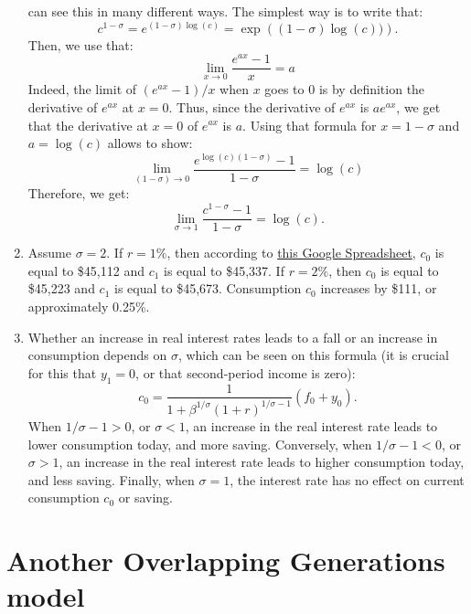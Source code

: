 \documentclass[]{book}
\begin{document}
\begin{enumerate}
  can see this in many different ways. The simplest way is to write
  that:
  \[c^{1-\sigma}=e^{(1-\sigma)\log(c)}=\exp\left((1-\sigma)\log(c))\right).\]
  Then, we use that: \[\lim_{x \to 0} \frac{e^{ax}-1}{x}=a\] Indeed, the
  limit of \((e^{ax}-1)/x\) when \(x\) goes to \(0\) is by definition
  the derivative of \(e^{ax}\) at \(x=0\). Thus, since the derivative of
  \(e^{ax}\) is \(ae^{ax}\), we get that the derivative at \(x=0\) of
  \(e^{ax}\) is \(a\). Using that formula for \(x = 1-\sigma\) and
  \(a=\log(c)\) allows to show:
  \[\lim_{(1-\sigma) \to 0} \frac{e^{\log(c)(1-\sigma)}-1}{1-\sigma}=\log(c)\]
  Therefore, we get:
  \[\lim_{\sigma \to 1} \frac{c^{1-\sigma}-1}{1-\sigma}=\log(c).\]
\item
  Assume \(\sigma = 2\). If \(r = 1\%\), then according to
  \href{https://docs.google.com/spreadsheets/d/1dDFa5YZE5170Tv36klHQ19ykK2bP9wjeR0Y1_h-kacg/edit?usp=sharing}{this
  Google Spreadsheet}, \(c_0\) is equal to \$45,112 and \(c_1\) is equal
  to \$45,337. If \(r = 2\%\), then \(c_0\) is equal to \$45,223 and
  \(c_1\) is equal to \$45,673. Consumption \(c_0\) increases by \$111,
  or approximately 0.25\%.
\item
  Whether an increase in real interest rates leads to a fall or an
  increase in consumption depends on \(\sigma\), which can be seen on
  this formula (it is crucial for this that \(y_1=0\), or that
  second-period income is zero):
  \[c_0 = \frac{1}{1 +\beta^{1/\sigma}(1+r)^{1/\sigma-1}} \left( f_0 + y_0\right).\]
  When \(1/\sigma-1>0\), or \(\sigma<1\), an increase in the real
  interest rate leads to lower consumption today, and more saving.
  Conversely, when \(1/\sigma-1<0\), or \(\sigma>1\), an increase in the
  real interest rate leads to higher consumption today, and less saving.
  Finally, when \(\sigma=1\), the interest rate has no effect on current
  consumption \(c_0\) or saving.
\end{enumerate}

\section{Another Overlapping Generations
model}\label{another-overlapping-generations-model-1}
\end{document}
